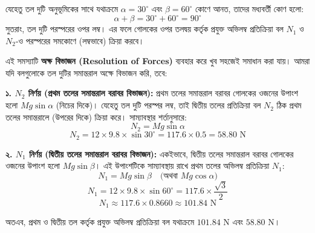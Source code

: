 \documentclass[12pt, a4paper]{article}
\begin{document}
\begin{tcolorbox}[solutionbox={সমাধান (Solution)}]
\noindent
যেহেতু তল দুটি অনুভূমিকের সাথে যথাক্রমে $\alpha = 30^\circ$ এবং $\beta = 60^\circ$ কোণে আনত, তাদের মধ্যবর্তী কোণ হলো:
$$\alpha + \beta = 30^\circ + 60^\circ = 90^\circ$$
সুতরাং, তল দুটি পরস্পরের ওপর লম্ব। এর ফলে গোলকের ওপর তলদ্বয় কর্তৃক প্রযুক্ত অভিলম্ব প্রতিক্রিয়া বল $N_1$ ও $N_2$-ও পরস্পরের সমকোণে (লম্বভাবে) ক্রিয়া করবে।

এই সমস্যাটি \textbf{অক্ষ বিভাজন (Resolution of Forces)} ব্যবহার করে খুব সহজেই সমাধান করা যায়। আমরা যদি বলগুলোকে তল দুটির সমান্তরাল অক্ষে বিভাজন করি, তবে:

\vspace{0.5em}
\textbf{১. $N_2$ নির্ণয় (প্রথম তলের সমান্তরাল বরাবর বিভাজন):}
প্রথম তলের সমান্তরাল বরাবর গোলকের ওজনের উপাংশ হলো $Mg \sin\alpha$ (নিচের দিকে)। যেহেতু তল দুটি পরস্পর লম্ব, তাই দ্বিতীয় তলের প্রতিক্রিয়া বল $N_2$ ঠিক প্রথম তলের সমান্তরালে (উপরের দিকে) ক্রিয়া করে। সাম্যাবস্থার শর্তানুসারে:
$$N_2 = Mg \sin\alpha$$
$$N_2 = 12 \times 9.8 \times \sin 30^\circ = 117.6 \times 0.5 = 58.80\text{ N}$$

\vspace{0.5em}
\textbf{২. $N_1$ নির্ণয় (দ্বিতীয় তলের সমান্তরাল বরাবর বিভাজন):}
একইভাবে, দ্বিতীয় তলের সমান্তরাল বরাবর গোলকের ওজনের উপাংশ হলো $Mg \sin\beta$। এই উপাংশটিকে সাম্যাবস্থায় রাখে প্রথম তলের অভিলম্ব প্রতিক্রিয়া $N_1$:
$$N_1 = Mg \sin\beta \quad \text{(অথবা } Mg \cos\alpha \text{)}$$
$$N_1 = 12 \times 9.8 \times \sin 60^\circ = 117.6 \times \frac{\sqrt{3}}{2}$$
$$N_1 \approx 117.6 \times 0.8660 \approx 101.84\text{ N}$$

অতএব, প্রথম ও দ্বিতীয় তল কর্তৃক প্রযুক্ত অভিলম্ব প্রতিক্রিয়া বল যথাক্রমে $101.84\text{ N}$ এবং $58.80\text{ N}$।
\end{tcolorbox}
\vspace{1em}
\end{document}
